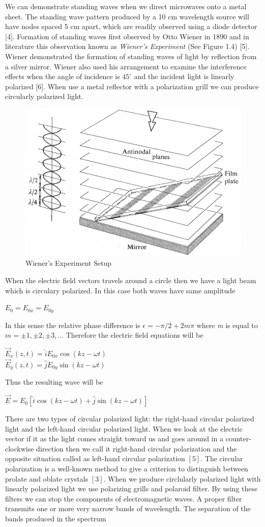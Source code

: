\documentclass[a4paper,12pt]{report}
\begin{document}
We can demonstrate standing waves when we direct microwaves onto a metal sheet. The standing wave pattern produced by a 10 cm wavelength source will have nodes spaced 5 cm apart, which are readily observed using a diode detector [4]. Formation of standing waves first observed by Otto Wiener in 1890 and in literature this observation known as \textit{Wiener's Experiment} (See Figure 1.4) [5]. Wiener demonstrated the formation of standing waves of light by reflection from a silver mirror.
Wiener also used his arrangement to examine the interference effects when the angle of incidence is $45^{\circ}$ and the incident light is linearly polarized [6]. When use a metal reflector with a polarization grill we can produce circularly polarized light. 
\begin{figure}[h]
\centering
\includegraphics[width=0.7\linewidth, height=0.25\textheight]{wiener}
\caption{Wiener's Experiment Setup}
\label{fig:wiener}
\end{figure}
When the electric field vectors travels around a circle then we have a light beam which is circulary polarized. In this case both waves have same amplitude
\begin{center}
	$E_{0}=E_{0x}=E_{0y}$ 
\end{center}
In this sense the relative phase difference is $\epsilon=-\pi/2+2m\pi$ where \textit{m} is equal to $m=\pm1,\pm2,\pm3,...$ Therefore the electric field equations will be  
\begin{center}
	$\vec{E}_{x}(z,t)=\hat{i}E_{0x}\cos(kz-\omega t)$\\$\vec{E}_{y}(z,t)=\hat{j}E_{0y}\sin(kz-\omega t)$
\end{center}
Thus the resulting wave will be
\begin{center}
	$\vec{E}=E_{0}[\hat{i}\cos(kz-\omega t)+\hat{j}\sin(kz-\omega t)]$
\end{center}
There are two types of circular polarized light: the right-hand circular polarized light and the left-hand circular polarized light. When we look at the electric vector if it as the light comes straight toward us and goes around in a counter-clockwise direction then we call it right-hand circular polarization and the opposite situation called as left-hand circular polarization $[5]$. The circular polarization is a well-known method to give a criterion to distinguish between prolate and oblate crystals $[3]$. When we produce circlularly polarized light with linearly polarized light we use polarizing grills and polaroid filter. By using these filters we can stop the components of electromagnetic waves. A proper filter transmits one or more very narrow bands of wavelength. The separation of the bands produced in the spectrum
\end{document}
